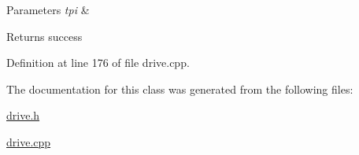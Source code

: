 \begin{DoxyParams}{Parameters}
{\em tpi} & \\
\hline
\end{DoxyParams}
\begin{DoxyReturn}{Returns}
success 
\end{DoxyReturn}


Definition at line 176 of file drive.\+cpp.



The documentation for this class was generated from the following files\+:\begin{DoxyCompactItemize}
\item 
\hyperlink{drive_8h}{drive.\+h}\item 
\hyperlink{drive_8cpp}{drive.\+cpp}\end{DoxyCompactItemize}
